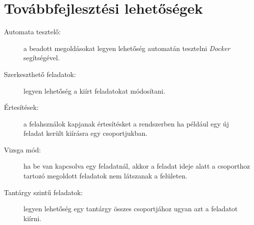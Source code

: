 \section{Továbbfejlesztési lehetőségek}
\begin{description}
    \item[Automata tesztelő:] a beadott megoldásokat legyen lehetőség automatán tesztelni \emph{Docker} segítségével.
    \item[Szerkeszthető feladatok:] legyen lehetőség a kiírt feladatokat módosítani.
    \item[Értesítések:] a felahsználok kapjanak értesítésket a rendszerben ha például egy új feladat került kiírásra egy csoportjukban.
    \item[Vizsga mód:] ha be van kapcsolva egy feladatnál, akkor a feladat ideje alatt a csoporthoz tartozó megoldott feladatok nem látszanak a felületen.
    \item[Tantárgy szintű feladatok:] legyen lehetőség egy tantárgy összes csoportjához ugyan azt a feladatot kiírni.    
\end{description}
